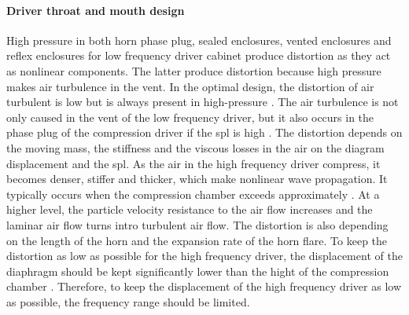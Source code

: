 \paragraph{Driver throat and mouth design} High pressure in both horn phase plug, sealed enclosures, vented enclosures and reflex enclosures for low frequency driver cabinet produce distortion as they act as nonlinear components. The latter produce distortion because high pressure makes air turbulence in the vent. In the optimal design, the distortion of air turbulent is low but is always present in high-pressure \citep{roozen1998reduction}. The air turbulence is not only caused in the vent of the low frequency driver, but it also occurs in the phase plug of the compression driver if the \gls{spl} is high \citep{czerwinski1999air}. The distortion depends on the moving mass, the stiffness and the viscous losses in the air on the diagram displacement and the \gls{spl}. As the air in the high frequency driver compress, it becomes denser, stiffer and thicker, which make nonlinear wave propagation. It typically occurs when the compression chamber exceeds approximately . At a higher level, the particle velocity resistance to the air flow increases and the laminar air flow turns intro turbulent air flow. The distortion is also depending on the length of the horn and the expansion rate of the horn flare. To keep the distortion as low as possible for the high frequency driver, the displacement of the diaphragm should be kept significantly lower than the hight of the compression chamber \citep{voishvillo2004comparative}. Therefore, to keep the displacement of the high frequency driver as low as possible, the frequency range should be limited.



